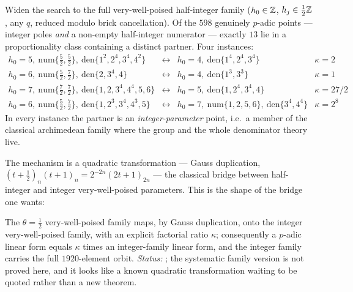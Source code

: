 \begin{finding}\label{find:F4}
 Widen the search to the full
very-well-poised half-integer family ($h_0\in\mathbb{Z}$, $h_j\in\tfrac12\mathbb{Z}$, any $q$, reduced
modulo brick cancellation). Of the $598$ genuinely $p$-adic points --- integer poles
\emph{and} a non-empty half-integer numerator --- exactly $13$ lie in a proportionality class
containing a distinct partner. Four instances:
\[
\begin{array}{llll}
 h_0=5,\ \mathrm{num}\{\tfrac52,\tfrac52\},\ \mathrm{den}\{1^2,2^4,3^4,4^2\}
   &\leftrightarrow& h_0=4,\ \mathrm{den}\{1^4,2^4,3^4\} & \kappa=2\\
 h_0=6,\ \mathrm{num}\{\tfrac52,\tfrac72\},\ \mathrm{den}\{2,3^4,4\}
   &\leftrightarrow& h_0=4,\ \mathrm{den}\{1^3,3^3\} & \kappa=1\\
 h_0=7,\ \mathrm{num}\{\tfrac72,\tfrac72\},\ \mathrm{den}\{1,2,3^4,4^4,5,6\}
   &\leftrightarrow& h_0=5,\ \mathrm{den}\{1,2^4,3^4,4\} & \kappa=27/2\\
 h_0=6,\ \mathrm{num}\{\tfrac52,\tfrac72\},\ \mathrm{den}\{1,2^3,3^4,4^3,5\}
   &\leftrightarrow& h_0=7,\ \mathrm{num}\{1,2,5,6\},\ \mathrm{den}\{3^4,4^4\} & \kappa=2^8
\end{array}
\]
In every instance the partner is an \emph{integer-parameter} point, i.e.\ a member of the
classical archimedean family where the group and the whole denominator theory live.
\end{finding}

The mechanism is a quadratic transformation --- Gauss duplication,
$(t+\tfrac12)_n(t+1)_n=2^{-2n}(2t+1)_{2n}$ --- the classical bridge between half-integer and
integer very-well-poised parameters. This is the shape of the bridge one wants:

\begin{openlemma}\label{ol:bridge}
\OPENC{} The $\theta=\tfrac12$ very-well-poised family maps, by Gauss duplication, onto the
integer very-well-poised family, with an explicit factorial ratio $\kappa$; consequently a
$p$-adic linear form equals $\kappa$ times an integer-family linear form, and the integer
family carries the full $1920$-element orbit. \emph{Status:} ; the systematic family version is not proved here, and
it looks like a known quadratic transformation waiting to be quoted rather than a new
theorem.
\end{openlemma}

